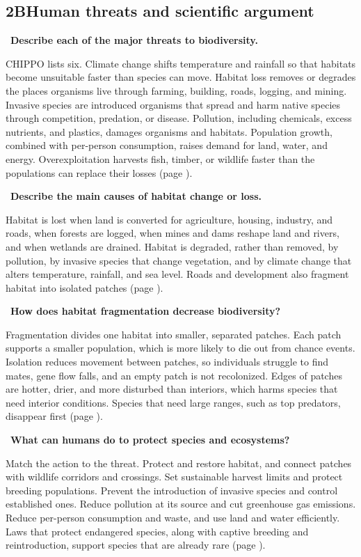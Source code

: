 \documentclass[11pt,letterpaper]{article}
\newcommand{\sq}[1]{\par\Needspace{6\baselineskip}\medskip{\color{forest}\textbf{Q.}}\ \textbf{#1}\par\smallskip}
\newcommand{\ans}[1]{#1\par}
\begin{document}
\subsection*{2B\quad Human threats and scientific argument}
\sq{Describe each of the major threats to biodiversity.}
\ans{CHIPPO lists six. Climate change shifts temperature and rainfall so that habitats become unsuitable faster than species can move. Habitat loss removes or degrades the places organisms live through farming, building, roads, logging, and mining. Invasive species are introduced organisms that spread and harm native species through competition, predation, or disease. Pollution, including chemicals, excess nutrients, and plastics, damages organisms and habitats. Population growth, combined with per-person consumption, raises demand for land, water, and energy. Overexploitation harvests fish, timber, or wildlife faster than the populations can replace their losses (page \pageref{twob}).}
\sq{Describe the main causes of habitat change or loss.}
\ans{Habitat is lost when land is converted for agriculture, housing, industry, and roads, when forests are logged, when mines and dams reshape land and rivers, and when wetlands are drained. Habitat is degraded, rather than removed, by pollution, by invasive species that change vegetation, and by climate change that alters temperature, rainfall, and sea level. Roads and development also fragment habitat into isolated patches (page \pageref{habitat}).}
\sq{How does habitat fragmentation decrease biodiversity?}
\ans{Fragmentation divides one habitat into smaller, separated patches. Each patch supports a smaller population, which is more likely to die out from chance events. Isolation reduces movement between patches, so individuals struggle to find mates, gene flow falls, and an empty patch is not recolonized. Edges of patches are hotter, drier, and more disturbed than interiors, which harms species that need interior conditions. Species that need large ranges, such as top predators, disappear first (page \pageref{twob}).}
\sq{What can humans do to protect species and ecosystems?}
\ans{Match the action to the threat. Protect and restore habitat, and connect patches with wildlife corridors and crossings. Set sustainable harvest limits and protect breeding populations. Prevent the introduction of invasive species and control established ones. Reduce pollution at its source and cut greenhouse gas emissions. Reduce per-person consumption and waste, and use land and water efficiently. Laws that protect endangered species, along with captive breeding and reintroduction, support species that are already rare (page \pageref{habitat}).}
\end{document}
